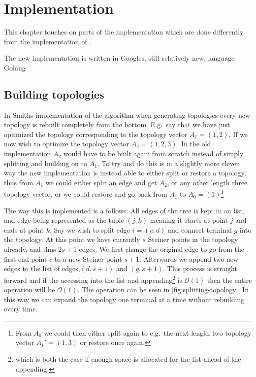  {
\abnormalparskip{0pt}
\chapter{Implementation}
\label{cha:implementation}
}

This chapter touches on parts of the implementation which are done differently
from the implementation of \textcite{smith1992}.

The new implementation is written in Googles, still relatively new, language
Golang~\cite{golanghomepage}


\section{Building topologies}
\label{sec:building-topologies}

In Smiths implementation of the algorithm when generating topologies every new
topology is rebuilt completely from the bottom. E.g.\ say that we have just
optimized the topology corresponding to the topology vector $A_1 = (1, 2)$. If we
now wish to optimize the topology vector $A_2 = (1, 2, 3)$. In the old
implementation $A_2$ would have to be built again from scratch instead of simply
splitting and building on to $A_1$. To try and do this is in a slightly more
clever way the new implementation is instead able to either split or restore a
topology, thus from $A_1$ we could either split an edge and get $A_2$, or any
other length three topology vector, or we could restore and go back from $A_1$
to $A_0 = (1)$\footnote{From $A_0$ we could then either split again to e.g.\ the
next length two topology vector $A_1' = (1, 3)$ or restore once again.}

The way this is implemented is a follows: All edges of the tree is kept in an
list, and edge being represented as the tuple $(j, k)$ meaning it starts at
point $j$ and ends at point $k$. Say we wish to split edge $i = (c,d)$ and
connect terminal $g$ into the topology. At this point we have currently $s$
Steiner points in the topology already, and thus $2s+1$ edges. We first change
the original edge to go from the first end point $c$ to a new Steiner point
$s+1$. Afterwards we append two new edges to the list of edges,$(d, s+1)$ and
$(g, s+1)$. This process is straight forward and if the accessing into the list
and appending\footnote{which is both the case if enough space is allocated for
  the list ahead of the appending.} is $\mathcal{O}(1)$ then the entire
operation will be $\mathcal{O}(1)$. The operation can be seen in
\cref{fig:splitting-topology}. In this way we can expand the topology one
terminal at a time without rebuilding every time.

